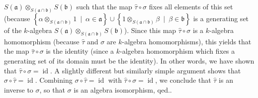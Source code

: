 \documentclass[etingof-lie.tex]{subfiles}
\begin{document}
{$S\left(  \mathfrak{a}\right)  \otimes_{S\left(  \mathfrak{a}\cap
\mathfrak{b}\right)  }S\left(  \mathfrak{b}\right)  $ such that the map
$\widehat{\tau}\circ\sigma$ fixes all elements of this set (because $\left\{
\alpha\otimes_{S\left(  \mathfrak{a}\cap\mathfrak{b}\right)  }1\ \mid
\ \alpha\in\mathfrak{a}\right\}  \cup\left\{  1\otimes_{S\left(
\mathfrak{a}\cap\mathfrak{b}\right)  }\beta\ \mid\ \beta\in\mathfrak{b}%
\right\}  $ is a generating set of the $k$-algebra $S\left(  \mathfrak{a}%
\right)  \otimes_{S\left(  \mathfrak{a}\cap\mathfrak{b}\right)  }S\left(
\mathfrak{b}\right)  $). Since this map $\widehat{\tau}\circ\sigma$ is a
$k$-algebra homomorphism (because $\widehat{\tau}$ and $\sigma$ are
$k$-algebra homomorphisms), this yields that the map $\widehat{\tau}%
\circ\sigma$ is the identity (since a $k$-algebra homomorphism which fixes a
generating set of its domain must be the identity). In other words, we have
shown that $\widehat{\tau}\circ\sigma=\operatorname*{id}$. A slightly
different but similarly simple argument shows that $\sigma\circ\widehat{\tau
}=\operatorname*{id}$. Combining $\sigma\circ\widehat{\tau}=\operatorname*{id}%
$ with $\widehat{\tau}\circ\sigma=\operatorname*{id}$, we conclude that
$\widehat{\tau}$ is an inverse to $\sigma$, so that $\sigma$ is an algebra
isomorphism, qed.}.
\end{document}
